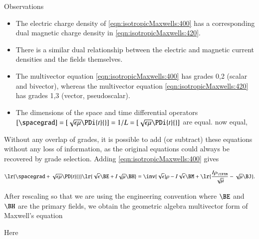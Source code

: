 Observations
\begin{itemize}
\item
The electric charge density of \cref{eqn:isotropicMaxwells:400} has a corresponding dual magnetic charge density in \cref{eqn:isotropicMaxwells:420}.
\item
There is a similar dual relationship between the electric and magnetic current densities and the fields themselves.
\item
The multivector equation \cref{eqn:isotropicMaxwells:400} has grades 0,2 (scalar and bivector), whereas the multivector equation \cref{eqn:isotropicMaxwells:420} has grades 1,3 (vector, pseudoscalar).
\item
The
dimensions of the space and time differential operators \( [\spacegrad] = [\sqrt{\epsilon\mu} \PDi{t}{}] = 1/L = [\sqrt{\epsilon\mu}\PDi{t}{}]\) are equal.
now equal,
\end{itemize}

Without any overlap of grades, it is possible to add (or subtract) these equations without any loss of information, as
the original equations could always be recovered by grade selection.
Adding \cref{eqn:isotropicMaxwells:400} gives

\begin{dmath}\label{eqn:isotropicMaxwells:440}
\lr{ \spacegrad + \sqrt{\epsilon\mu} \PD{t}{} }
\lr{ \sqrt{\epsilon} \BE
+
I \sqrt{\mu} \BH
}
=
\inv{\sqrt{\epsilon}} \rho
- I \sqrt{\epsilon} \BM
+\lr{
\frac{I \rho_\txtm}{\sqrt{\mu}}
- \sqrt{\mu} \BJ
}
.
\end{dmath}

After rescaling so that we are using
the engineering convention where \( \BE \) and \( \BH \) are the primary fields, we obtain the geometric algebra multivector form of Maxwell's equation

Here

